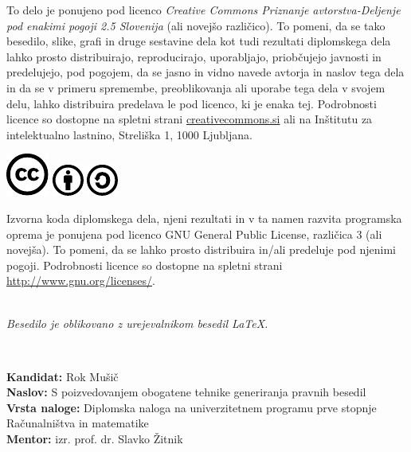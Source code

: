\documentclass[a4paper,12pt,openright]{book}
\newcommand{\ttitle}{S poizvedovanjem obogatene tehnike generiranja pravnih besedil}
\newcommand{\tauthor}{Rok Mušič}
\newcommand{\clearemptydoublepage}{\newpage{\pagestyle{empty}\cleardoublepage}}
\newcommand{\CcImageCc}[1]{%
	\includegraphics[scale=#1]{cc_cc_30.pdf}%
}
\newcommand{\CcImageBy}[1]{%
	\includegraphics[scale=#1]{cc_by_30.pdf}%
}
\newcommand{\CcImageSa}[1]{%
	\includegraphics[scale=#1]{cc_sa_30.pdf}%
}
\begin{document}
\newpage
\thispagestyle{empty}

\vspace*{5cm}
{\small \noindent
To delo je ponujeno pod licenco \textit{Creative Commons Priznanje avtorstva-Deljenje pod enakimi pogoji 2.5 Slovenija} (ali novej\v so razli\v cico). To pomeni, da se tako besedilo, slike, grafi in druge sestavine dela kot tudi rezultati diplomskega dela lahko prosto distribuirajo, reproducirajo, uporabljajo, priobčujejo javnosti in predelujejo, pod pogojem, da se jasno in vidno navede avtorja in naslov tega dela in da se v primeru spremembe, preoblikovanja ali uporabe tega dela v svojem delu, lahko distribuira predelava le pod licenco, ki je enaka tej. Podrobnosti licence so dostopne na spletni strani \href{http://creativecommons.si}{creativecommons.si} ali na Inštitutu za intelektualno lastnino, Streliška 1, 1000 Ljubljana.

\vspace*{1cm}
\begin{center}%
\CcImageCc{0.741573033707865}\hspace*{1ex}\CcImageBy{1}\hspace*{1ex}\CcImageSa{1}%
\end{center}
}

\vspace*{1cm}
{\small \noindent
Izvorna koda diplomskega dela, njeni rezultati in v ta namen razvita programska oprema je ponujena pod licenco GNU General Public License, različica 3 (ali novejša). To pomeni, da se lahko prosto distribuira in/ali predeluje pod njenimi pogoji. Podrobnosti licence so dostopne na spletni strani \url{http://www.gnu.org/licenses/}.
}

\vfill
\begin{center} 
\ \\ \vfill
{\em
Besedilo je oblikovano z urejevalnikom besedil \LaTeX.}
\end{center}

\clearemptydoublepage

\thispagestyle{empty}
\
\vfill

\bigskip
\noindent\textbf{Kandidat:} \tauthor\\
\noindent\textbf{Naslov:} \ttitle\\
\noindent\textbf{Vrsta naloge:} Diplomska naloga na univerzitetnem programu prve stopnje Računalništva in matematike \\
\noindent\textbf{Mentor:} izr. prof. dr. Slavko Žitnik\\
\end{document}
